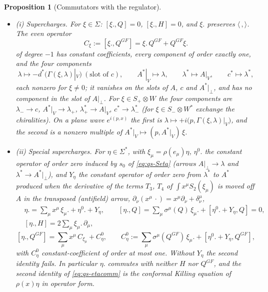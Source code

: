 \documentclass[11pt]{article}
\numberwithin{equation}{section}
\theoremstyle{plain}
\newtheorem{proposition}[theorem]{Proposition}
\theoremstyle{definition}
\newcommand{\Ap}{A|_{\perp}}
\begin{document}
\begin{proposition}[Commutators with the regulator]
\label{prop:qs-comm}
\begin{itemize}
\item (i) Supercharges. For $\xi\in\Sigma$: $[\xi.,Q]=0$, $[\xi.,H]=0$, and $\xi.$ preserves $\langle\,,\rangle$. The even operator
\begin{equation}
C_\xi:=[\xi.,Q^{GF}]=\xi.\,Q^{GF}+Q^{GF}\xi.
\label{eq:qs-Cxi}
\end{equation}
of degree $-1$ has constant coefficients, every component of order exactly one, and the four components
\[
\lambda\mapsto-d^*\big(\Gamma(\xi,\lambda)|_V\big)\ (\text{slot of }c),\qquad A^*|_V\mapsto\lambda,\qquad \lambda^*\mapsto A|_V,\qquad c^*\mapsto\lambda^*,
\]
each nonzero for $\xi\neq0$; it vanishes on the slots of $A$, $c$ and $A^*|_\perp$, and has no component in the slot of $A|_\perp$. For $\xi\in S_+\otimes W$ the four components are $\lambda_-\to c$, $A^*|_V\to\lambda_+$, $\lambda^*_+\to A|_V$, $c^*\to\lambda^*_-$ (for $\xi\in S_-\otimes W^*$ exchange the chiralities). On a plane wave $e^{i(p,x)}$ the first is $\lambda\mapsto+i\big(p,\Gamma(\xi,\lambda)|_V\big)$, and the second is a nonzero multiple of $A^*|_V\mapsto(p,A^*|_V)\,\xi$.
\item (ii) Special supercharges. For $\eta\in\Sigma^*$, with $\xi_\mu=\rho(e_\mu)\eta$, $\eta^0.$ the constant operator of order zero induced by $s_0$ of \eqref{eq:qs-Seta} (arrows $\Ap\to\lambda$ and $\lambda^*\to A^*|_\perp$), and $Y_\eta$ the constant operator of order zero from $\lambda^*$ to $A^*$ produced when the derivative of the terms $T_3$, $T_4$ of $\int x^\mu S_2(\xi_\mu)$ is moved off $A$ in the transposed (antifield) arrow, $\partial_\nu(x^\mu\,\cdot)=x^\mu\partial_\nu+\delta^\mu_\nu$,
\begin{equation}
\begin{aligned}
&\eta.=\sum_\mu x^\mu\,\xi_\mu.+\eta^0.+Y_\eta,\qquad [\eta.,Q]=\sum_\mu\sigma^\mu(Q)\,\xi_\mu.+[\eta^0.+Y_\eta,Q]=0,\\
&[\eta.,H]=2\sum_\mu\xi_\mu.\,\partial_\mu,
\end{aligned}
\label{eq:qs-etacomm}
\end{equation}
\[
[\eta.,Q^{GF}]=\sum_\mu x^\mu\,C_{\xi_\mu}+C^0_\eta,\qquad C^0_\eta:=\sum_\mu\sigma^\mu(Q^{GF})\,\xi_\mu.+[\eta^0.+Y_\eta,Q^{GF}],
\]
with $C^0_\eta$ constant-coefficient of order at most one. Without $Y_\eta$ the second identity fails. In particular $\eta.$ commutes with neither $H$ nor $Q^{GF}$, and the second identity of \eqref{eq:qs-etacomm} is the conformal Killing equation of $\rho(x)\eta$ in operator form.

\end{itemize}
\end{proposition}
\end{document}
